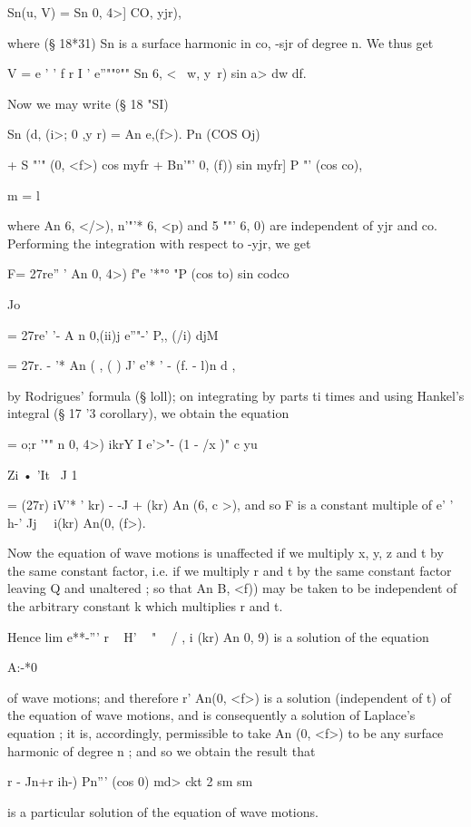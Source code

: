 Sn(u, V) = Sn 0, 4>] CO, yjr),

where (§ 18*31) Sn is a surface harmonic in co, -sjr of degree n. We
thus get

V = e ' ' f r I ' e''""°"" Sn 6, < \ w, y\ r) sin a> dw df.

Now we may write (§ 18 "SI)

Sn (d, (i>; 0 ,y r) = An e,(f>). Pn (COS Oj)

+ S "'" (0, <f>) cos myfr + Bn'"' 0, (f)) sin myfr] P "' (cos co),

m = l

where An 6, </>), n'"'* 6, <p) and 5 ""' 6, 0) are independent of yjr
and co. Performing the integration with respect to -yjr, we get

F= 27re'' ' An 0, 4>) f"e '*"° "P (cos to) sin codco

Jo

= 27re' '- A n 0,(ii)j e''"-' P,, (/i) djM

= 27r. - '* An ( , ( ) J' e'* ' - (f. - l)n d ,

by Rodrigues' formula (§ loll); on integrating by parts ti times and
using Hankel's integral (§ 17 '3 corollary), we obtain the equation

 = o;r '"" n 0, 4>) ikrY I e'>"- (1 - /x )" c yu

Zi • 'It \ J 1

= (27r) iV'* ' kr) - -J + (kr) An (6, c >), and so F is a constant
multiple of e' ' h-' Jj \ \ i(kr) An(0, (f>).

Now the equation of wave motions is unaffected if we multiply x, y, z
and t by the same constant factor, i.e. if we multiply r and t by the
same constant factor leaving Q and unaltered ; so that An B, <f)) may
be taken to be independent of the arbitrary constant k which
multiplies r and t.

Hence lim e**-''' r ~ H' ~ " ~ / , i (kr) An 0, 9) is a solution of
the equation

A:-*0

of wave motions; and therefore r' An(0, <f>) is a solution
(independent of t) of the equation of wave motions, and is
consequently a solution of Laplace's equation ; it is, accordingly,
permissible to take An (0, <f>) to be any surface harmonic of degree n
; and so we obtain the result that



r - Jn+r ih-) Pn''' (cos 0) md> ckt 2 sm sm

is a particular solution of the equation of wave motions.



